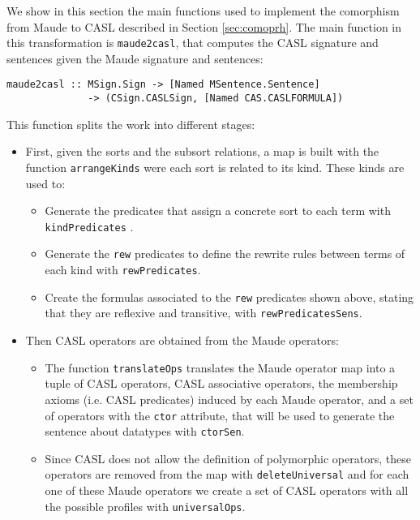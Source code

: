 
We show in this section the main functions used to implement the comorphism
from Maude to CASL described in Section \ref{sec:comoprh}.
The main function in this transformation is
\verb"maude2casl", that computes the CASL signature and sentences
given the Maude signature and sentences:

{\codesize
\begin{verbatim}
maude2casl :: MSign.Sign -> [Named MSentence.Sentence]
              -> (CSign.CASLSign, [Named CAS.CASLFORMULA])
\end{verbatim}
}

This function splits the work into different stages:

\begin{itemize}
\item First, given the sorts and the subsort relations, a map is built
with the function \verb"arrangeKinds" were each sort is related to its
kind. These kinds are used to:

\begin{itemize}
\item Generate the predicates 
that assign a concrete sort to each term with \verb"kindPredicates" .
\item Generate the \verb"rew" predicates to define the rewrite rules
between terms of each kind with \verb"rewPredicates".
\item Create the formulas associated to the \verb"rew" predicates
shown above, stating that they are reflexive and transitive, with
\verb"rewPredicatesSens".
\end{itemize}

\item Then CASL operators are obtained from the Maude operators:

\begin{itemize}
\item The function \verb"translateOps" translates the Maude operator map
into a tuple of CASL operators, CASL associative operators,
the membership axioms (i.e. CASL predicates) induced by each Maude operator,
and a set of operators with the \verb"ctor" attribute, that will be
used to generate the sentence about datatypes with \verb"ctorSen".
\item Since CASL does not allow the definition
of polymorphic operators, these operators are removed from the map
with \verb"deleteUniversal" and for each one of these Maude operators we
create a set of CASL operators with all the possible profiles with
\verb"universalOps".
\end{itemize}


\end{itemize}
